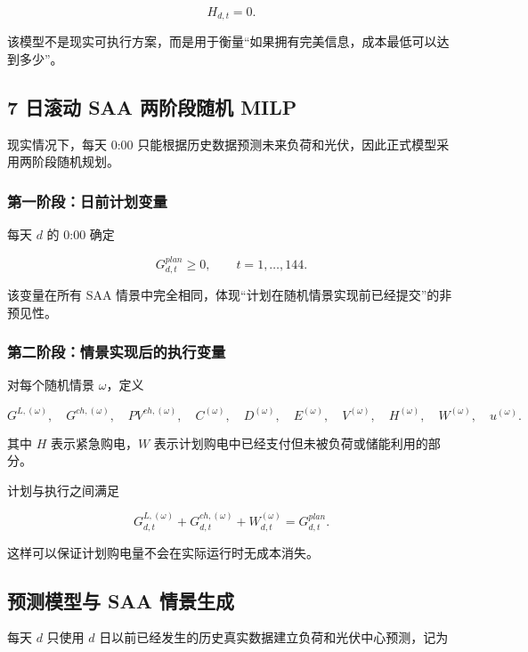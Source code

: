 \[
H_{d,t}=0.
\]

该模型不是现实可执行方案，而是用于衡量“如果拥有完美信息，成本最低可以达到多少”。

\subsection{7 日滚动 SAA 两阶段随机 MILP}

现实情况下，每天 0:00 只能根据历史数据预测未来负荷和光伏，因此正式模型采用两阶段随机规划。

\subsubsection{第一阶段：日前计划变量}

每天 \(d\) 的 0:00 确定

\begin{equation}
G^{plan}_{d,t}\ge0,
\qquad t=1,\ldots,144.
\end{equation}

该变量在所有 SAA 情景中完全相同，体现“计划在随机情景实现前已经提交”的非预见性。

\subsubsection{第二阶段：情景实现后的执行变量}

对每个随机情景 \(\omega\)，定义

\[
G^{L,(\omega)},\quad
G^{ch,(\omega)},\quad
PV^{ch,(\omega)},\quad
C^{(\omega)},\quad
D^{(\omega)},\quad
E^{(\omega)},\quad
V^{(\omega)},\quad
H^{(\omega)},\quad
W^{(\omega)},\quad
u^{(\omega)}.
\]

其中 \(H\) 表示紧急购电，\(W\) 表示计划购电中已经支付但未被负荷或储能利用的部分。

计划与执行之间满足

\begin{equation}
G_{d,t}^{L,(\omega)}
+
G_{d,t}^{ch,(\omega)}
+
W_{d,t}^{(\omega)}
=
G_{d,t}^{plan}.
\end{equation}

这样可以保证计划购电量不会在实际运行时无成本消失。

\subsection{预测模型与 SAA 情景生成}

每天 \(d\) 只使用 \(d\) 日以前已经发生的历史真实数据建立负荷和光伏中心预测，记为


